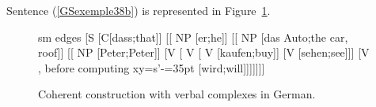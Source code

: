 \documentclass[output=paper
                ,modfonts
                ,nonflat
	        ,collection
	        ,collectionchapter
	        ,collectiontoclongg
 	        ,biblatex
                ,babelshorthands
                ,newtxmath
                ,draftmode
                ,colorlinks, citecolor=brown
]{./langsci/langscibook}
\begin{document}
{\begin{exe}
    \label{GSexemple43}
\end{exe}

\begin{exe}
    \label{GSexemple44}
\end{exe}

Sentence (\ref{GSexemple38b}) is represented in Figure~\ref{GSfigure11}. 



\begin{figure}
    \centering
    {\footnotesize
	\begin{forest}
	sm edges
	[S
		[C[dass;that]]
    	[[ NP [er;he]]
     		[[ NP [das Auto;the car, roof]]
     			[[ NP [Peter;Peter]]
     			[V 
			     				[ V 
                		[ V  
                			[kaufen;buy]]
                		[V  [sehen;see]]]
     [V , before computing xy={s'-=35pt} [wird;will]]]]]]]
 \end{forest}}    
    \caption{Coherent construction with verbal complexes in German.}
    \label{GSfigure11}
\end{figure}

}
\end{document}
